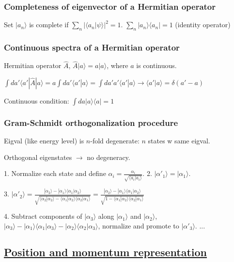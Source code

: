 \subsubsection{Completeness of eigenvector of a Hermitian operator}
Set $|a_n \rangle$ is complete if $\sum_n |\langle a_n | \psi \rangle|^2 = 1$.
$\sum_n |a_n \rangle \langle a_n | = 1$ (identity operator)

\subsubsection{Continuous spectra of a Hermitian operator}

Hermitian operator $\widehat{A}$, $\widehat{A} | a \rangle = a | a \rangle$, where $a$ is continuous. 

$\int da' \langle a' | \widehat{A} | a \rangle = a \int da' \langle a' | a \rangle = \int da' a' \langle a' | a \rangle \rightarrow \langle a' | a \rangle = \delta (a' - a)$

Continuous condition: $\int da | a \rangle \langle a | = 1$

\subsubsection{Gram-Schmidt orthogonalization procedure}

Eigval (like energy level) is $n$-fold degenerate: $n$ states w same eigval.

Orthogonal eigenstates $\rightarrow$ no degeneracy.

1. Normalize each state and define $\alpha_i = \frac{\alpha_i}{\sqrt{\langle a_i | a_i \rangle}}$. 2. $|\alpha'_1 \rangle = | \alpha_1 \rangle$.

3. $|\alpha'_2 \rangle = \frac{|\alpha_2 \rangle - |\alpha_1 \rangle \langle \alpha_1 | \alpha_2 \rangle}{\sqrt{\langle \alpha_2 | \alpha_2 \rangle - \langle \alpha_1 | \alpha_2 \rangle \langle \alpha_2 | \alpha_1 \rangle}} = \frac{|\alpha_2 \rangle - |\alpha_1 \rangle \langle \alpha_1 | \alpha_2 \rangle}{\sqrt{1 - \langle \alpha_1 | \alpha_2 \rangle \langle \alpha_2 | \alpha_1 \rangle}}$

4. Subtract components of $|\alpha_3 \rangle$ along $|\alpha_1 \rangle$ and $|\alpha_2 \rangle$, $|\alpha_3 \rangle - |\alpha_1 \rangle \langle \alpha_1 | \alpha_3 \rangle - | \alpha_2 \rangle \langle \alpha_2 | \alpha_3 \rangle$, normalize and promote to $|\alpha'_3 \rangle$.
...

\subsection{\underline{Position and momentum representation}}

